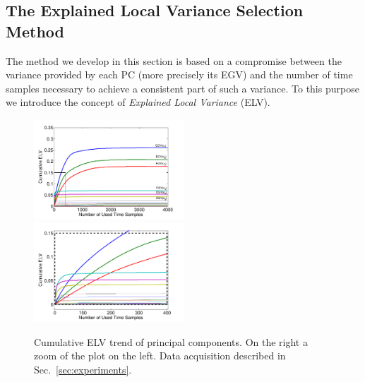 \subsection{The Explained Local Variance Selection Method} 
The method we develop in this section is based on a compromise between the variance provided by each PC (more precisely its EGV) and the number of time samples necessary to achieve a consistent part of such a variance. To this purpose we  introduce the concept of {\em Explained Local Variance} (ELV).
\begin{figure}
\includegraphics[width=0.5\textwidth]{figures/cumulativeELVallRectangle.pdf} 
\includegraphics[width=0.5\textwidth]{figures/cumulativeELVzoomedRectangle.pdf} 
\caption{Cumulative ELV trend of principal components. On the right a zoom of the plot on the left. Data acquisition described in Sec.~\ref{sec:experiments}.}\label{fig:ELVcumulative}
\end{figure}

